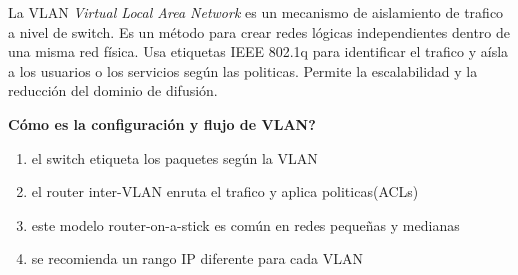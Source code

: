 La VLAN \textit{Virtual Local Area Network} es un mecanismo de aislamiento de trafico a nivel de switch. Es un método para crear redes lógicas independientes dentro de una misma red física. Usa etiquetas IEEE 802.1q para identificar el trafico y aísla a los usuarios o los servicios según las politicas. Permite la escalabilidad y la reducción del dominio de difusión.

\textbf{Cómo es la configuración y flujo de VLAN?}

\begin{enumerate}
\item el switch etiqueta los paquetes según la VLAN
\item el router inter-VLAN enruta el trafico y aplica politicas(ACLs)
\item este modelo router-on-a-stick es común en redes pequeñas y medianas
\item se recomienda un rango IP diferente para cada VLAN
\end{enumerate}



